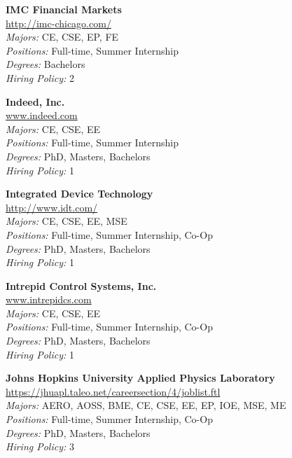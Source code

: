 \documentclass[twoside]{article}
\begin{document}
\begin{center}
\begin{multicols}{3}
\begin{minipage}{.9\columnwidth}{\Large\bf IMC Financial Markets }\\
	\url{http://imc-chicago.com/}\\
	\emph{Majors:} CE, CSE, EP, FE\\
	\emph{Positions:} Full-time, Summer Internship\\
	\emph{Degrees:} Bachelors\\
	\emph{Hiring Policy:} 2\\
\end{minipage}
 
\begin{minipage}{.9\columnwidth}{\Large\bf Indeed, Inc. }\\
	\url{www.indeed.com}\\
	\emph{Majors:} CE, CSE, EE\\
	\emph{Positions:} Full-time, Summer Internship\\
	\emph{Degrees:} PhD, Masters, Bachelors\\
	\emph{Hiring Policy:} 1\\
\end{minipage}
 
\begin{minipage}{.9\columnwidth}{\Large\bf Integrated Device Technology }\\
	\url{http://www.idt.com/}\\
	\emph{Majors:} CE, CSE, EE, MSE\\
	\emph{Positions:} Full-time, Summer Internship, Co-Op\\
	\emph{Degrees:} PhD, Masters, Bachelors\\
	\emph{Hiring Policy:} 1\\
\end{minipage}
 
\begin{minipage}{.9\columnwidth}{\Large\bf Intrepid Control Systems, Inc. }\\
	\url{www.intrepidcs.com}\\
	\emph{Majors:} CE, CSE, EE\\
	\emph{Positions:} Full-time, Summer Internship, Co-Op\\
	\emph{Degrees:} PhD, Masters, Bachelors\\
	\emph{Hiring Policy:} 1\\
\end{minipage}
 
\begin{minipage}{.9\columnwidth}{\Large\bf Johns Hopkins University Applied Physics Laboratory }\\
	\url{https://jhuapl.taleo.net/careersection/4/joblist.ftl}\\
	\emph{Majors:} AERO, AOSS, BME, CE, CSE, EE, EP, IOE, MSE, ME\\
	\emph{Positions:} Full-time, Summer Internship, Co-Op\\
	\emph{Degrees:} PhD, Masters, Bachelors\\
	\emph{Hiring Policy:} 3\\
\end{minipage}
 

\end{multicols}
\end{center}
\end{document}
